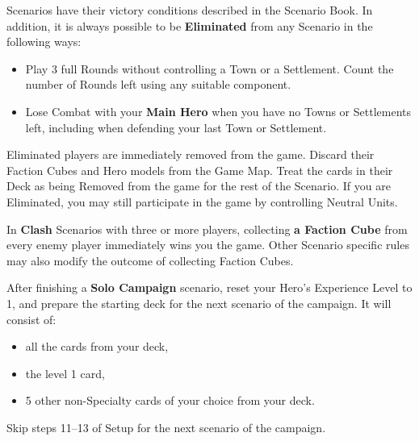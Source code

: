 
\begin{multicols*}{2}

 Scenarios have their victory conditions described in the Scenario Book.
In addition, it is always possible to be \textbf{Eliminated} from any Scenario in the following ways:
\begin{itemize}
  \item Play 3 full Rounds without controlling a Town or a Settlement.
    Count the number of Rounds left using any suitable component.
  \item Lose Combat with your \textbf{Main Hero} when you have no Towns or Settlements left, including when defending your last Town or Settlement.
\end{itemize}
Eliminated players are immediately removed from the game.
Discard their Faction Cubes and Hero models from the Game Map.
Treat the cards in their Deck as being Removed from the game for the rest of the Scenario.
If you are Eliminated, you may still participate in the game by controlling Neutral Units.\par
{}\par

In \textbf{Clash} Scenarios with three or more players, collecting \textbf{a Faction Cube} from every enemy player immediately wins you the game.
Other Scenario specific rules may also modify the outcome of collecting Faction Cubes.

\columnbreak

After finishing a \textbf{Solo Campaign} scenario, reset your Hero's Experience Level to 1, and prepare the starting deck for the next scenario of the campaign.
It will consist of:
\begin{itemize}
  \item all the  cards from your deck,
  \item the level 1  card,
  \item 5 other non-Specialty cards of your choice from your deck.
\end{itemize}
Skip steps 11--13 of Setup for the next scenario of the campaign.

\vspace*{\fill}
\hspace{-3em}
{}

\end{multicols*}

